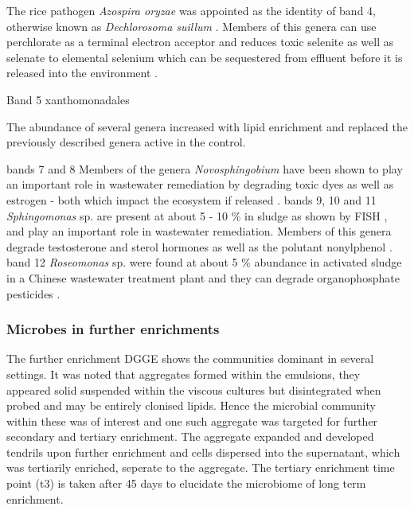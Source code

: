 \documentclass[11pt]{article}
\begin{document}
The rice pathogen \emph{Azospira oryzae} was appointed as the identity of band 4, otherwise known as \emph{Dechlorosoma suillum} \cite{tan2003dechlorosoma}. Members of this genera can use perchlorate as a terminal electron acceptor and reduces toxic selenite as well as selenate to elemental selenium which can be sequestered from effluent before it is released into the environment \cite{reinhold2000reassessment,hunter2007azospira,wilhelmus2013microbiological}.

Band 5 xanthomonadales

The abundance of several genera increased with lipid enrichment and replaced the previously described genera active in the control.

bands 7 and 8 Members of the genera \emph{Novosphingobium} have been shown to play an important role in wastewater remediation by degrading toxic dyes as well as estrogen - both which impact the ecosystem if released \cite{addison2007novosphingobium,hashimoto2009contribution}.
bands 9, 10 and 11 \emph{Sphingomonas} sp. are present at about 5 - 10 \% in sludge as shown by FISH \cite{neef1999detection}, and play an important role in wastewater remediation. Members of this genera degrade testosterone and sterol hormones as well as the polutant nonylphenol \cite{fujii2001sphingomonas,roh201017beta}.
band 12 \emph{Roseomonas} sp. were found at about 5 \% abundance in activated sludge in a Chinese wastewater treatment plant and they can degrade organophosphate pesticides \cite{jiang2008bacterial,jiang2006isolation}.

\subsubsection{Microbes in further enrichments}
The further enrichment DGGE shows the communities dominant in several settings. It was noted that aggregates formed within the emulsions, they appeared solid suspended within the viscous cultures but disintegrated when probed and may be entirely clonised lipids. Hence the microbial community within these was of interest and one such aggregate was targeted for further secondary and tertiary enrichment. The aggregate expanded and developed tendrils upon further enrichment and    cells dispersed into the supernatant, which was tertiarily enriched, seperate to the aggregate. The tertiary enrichment time point (t3) is taken after 45 days to elucidate the microbiome of long term enrichment.
\end{document}
